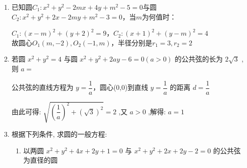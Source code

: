 \begin{enumerate}
    \item 已知圆$C_1: x^2+y^2-2mx+4y+m^2-5 = 0$与圆$C_2: x^2+y^2+2x-2my+m^2-3=0$，当$m$为何值时：
    \begin{jieda}
        $C_1: (x-m)^2 + (y+2)^2 = 9$，$C_2: (x+1)^2+(y-m)^2 = 4$ \\
        故圆心$O_1(m, -2), O_2(-1, m)$，半径分别是$r_1 = 3, r_2 = 2$ 
    \end{jieda}
    \item 若圆 ${x}^{2} + {y}^{2} = 4$ 与圆 ${x}^{2} + {y}^{2} + {2ay} - 6 = 0\left( {a > 0}\right)$ 的公共弦的长为 $2\sqrt{3}$ ,则 $a =$
    \begin{jieda}
        公共弦的直线方程为 $y = \dfrac{1}{a}$，圆心(0,0)到直线 $y = \dfrac{1}{a}$ 的距离 $d = \dfrac{1}{a}$
        
        由此可得: $\sqrt{{\left( \dfrac{1}{a}\right) }^{2} + {\left( \sqrt{3}\right) }^{2}} = 2$ ,又 $a > 0$ ,解得: $a = 1$
    \end{jieda}

    \item 根据下列条件, 求圆的一般方程:
    \begin{enumerate}
        \item 以两圆 ${x}^{2} + {y}^{2} + {4x} + {2y} + 1 = 0$ 与 ${x}^{2} + {y}^{2} + {2x} + {2y} - 2 = 0$ 的公共弦为直径的圆
        \begin{jieda}
            

\end{jieda}
\end{enumerate}
\end{enumerate}
